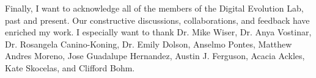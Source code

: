 Finally, I want to acknowledge all of the members of the Digital Evolution Lab, past and present.
Our constructive discussions, collaborations, and feedback have enriched my work.
I especially want to thank
Dr. Mike Wiser,
Dr. Anya Vostinar,
Dr. Rosangela Canino-Koning,
Dr. Emily Dolson,
Anselmo Pontes,
Matthew Andres Moreno,
Jose Guadalupe Hernandez,
Austin J. Ferguson,
Acacia Ackles,
Kate Skocelas,
and Clifford Bohm.







